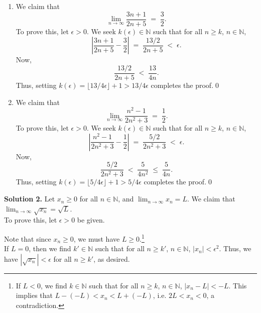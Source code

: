 \documentclass[10pt]{article}
\begin{document}
\begin{enumerate}
                \item We claim that
                        \[
                        \lim_{n\to \infty} \frac{3n + 1}{2n + 5} \;=\; \frac{3}{2}.
                        \]
                        To prove this, let $\epsilon > 0$. We seek $k(\epsilon) \in \mathbb{N}$ such that for all $n \ge k$, $n \in \mathbb{N}$,
                        \[
                        \left| \frac{3n + 1}{2n + 5} - \frac{3}{2}\right| \;=\; \frac{13 /2}{2n + 5} \;<\; \epsilon.
                        \]
                        Now,
                        \[
                        \frac{13 /2}{2n + 5} \;<\; \frac{13}{4n}.
                        \]
                        Thus, setting $k(\epsilon) = \lfloor 13 /4\epsilon\rfloor + 1 > 13 /4\epsilon$ completes the proof.\qed\\
                \item We claim that
                        \[
                        \lim_{n\to \infty} \frac{n^2 - 1}{2n^2 + 3} \;=\; \frac{1}{2}.
                        \]
                        To prove this, let $\epsilon > 0$. We seek $k(\epsilon) \in \mathbb{N}$ such that for all $n \ge k$, $n \in \mathbb{N}$,
                        \[
                        \left| \frac{n^2 - 1}{2n^2 + 3} - \frac{1}{2}\right| \;=\; \frac{5 /2}{2n^2 + 3} \;<\; \epsilon.
                        \]
                        Now,
                        \[
                        \frac{5 /2}{2n^2 + 3} \;<\; \frac{5}{4n^2} \;\le\; \frac{5}{4n}.
                        \]
                        Thus, setting $k(\epsilon) = \lfloor 5 /4\epsilon\rfloor + 1 > 5 /4\epsilon$ completes the proof.\qed\\
        \end{enumerate}

        \textbf{Solution 2.}
        Let $x_n \ge 0$ for all $n \in \mathbb{N}$, and $\lim_{n\to\infty} x_n = L$. We claim that $\lim_{n\to\infty} \sqrt{x_n} = \sqrt{L}$.\\
       
        To prove this, let $\epsilon > 0$ be given.
        
        Note that since $x_n \ge 0$, we must have $L \ge 0$.\footnote[2]{
        If $L < 0$, we find $k \in \mathbb{N}$ such that for all $n \ge k$, $n \in \mathbb{N}$, $|x_n - L| < -L$.
        This implies that $L - (-L) < x_n < L + (-L)$, i.e. $2L < x_n < 0$, a contradiction.} \\

        If $L = 0$, then we find $k' \in \mathbb{N} $ such that for all $n \ge k'$, $n \in \mathbb{N}$, $|x_n| < \epsilon^2$.
        Thus, we have $|\sqrt{x_n}| < \epsilon$ for all $n \ge k'$, as desired.
        
\end{document}
